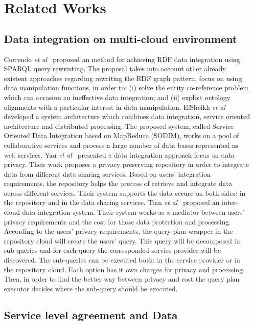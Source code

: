 \section{Related Works}\label{sec:rw}

\subsection{Data integration on multi-cloud environment}
Correndo \textit{et al}~\cite{075} proposed an method for achieving RDF data integration
using SPARQL query rewrinting. 
The proposal takes into account other already existent approaches regarding rewriting 
the RDF graph pattern, focus on using data manipulation functions, in order to: (i) solve 
the entity co-reference problem which can occasion an ineffective data integration; 
and (ii) exploit ontology alignments with a particular interest in data manipulation. 
ElSheikh \textit{et al}~\cite{078} developed a system architecture which combines data integration,
service oriented architecture and distributed processing. The proposed system, called Service 
Oriented Data Integration based on MapReduce (SODIM), works on a pool of collaborative services and 
process a large number of data bases represented as web services. 
Yau \textit{et al}~\cite{YauY08} presented a data integration approach focus on data privacy.
Their work proposes a privacy preserving repository in order to integrate data from
different data sharing services. 
Based on users' integration requirements, the repository helps the process of retrieve and integrate
data across different services.
Their system supports the data secure on both sides: in the repository and in the data sharing services. 
Tian \textit{et al}~\cite{096} proposed an inter-cloud data integration system. 
Their system works as a mediator between users' privacy requirements and the cost for those data 
protection and processing.
According to the users' privacy requirements, the query plan wrapper in the repository cloud will
create the users' query. This query will be decomposed in sub-queries and for each query the 
corresponded service provider will be discovered. 
The sub-queries can be executed both: in the service provider or in the repository cloud.
Each option has it own charges for privacy and processing. 
Then, in order to find the better way between privacy and cost the query plan executor decides where 
the sub-query should be executed.

\subsection{Service level agreement and Data}





